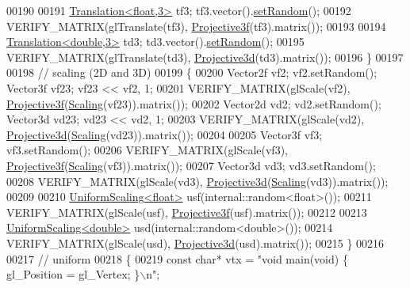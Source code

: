\begin{DoxyCode}
00190     
00191     \hyperlink{group___geometry___module_class_eigen_1_1_translation}{Translation<float,3>} tf3; tf3.vector().\hyperlink{class_eigen_1_1_plain_object_base_af0e576a0e1aefc9ee346de44cc352ba3}{setRandom}();
00192     VERIFY\_MATRIX(glTranslate(tf3), \hyperlink{group___geometry___module_gab14804071b7486b6666f3d324475a478}{Projective3f}(tf3).matrix());
00193     
00194     \hyperlink{group___geometry___module_class_eigen_1_1_translation}{Translation<double,3>} td3;  td3.vector().\hyperlink{class_eigen_1_1_plain_object_base_af0e576a0e1aefc9ee346de44cc352ba3}{setRandom}();
00195     VERIFY\_MATRIX(glTranslate(td3), \hyperlink{group___geometry___module_gab9cec8c457da930391eb73370e07aaae}{Projective3d}(td3).matrix());
00196   \}
00197   
00198   \textcolor{comment}{// scaling (2D and 3D)}
00199   \{
00200     Vector2f vf2; vf2.setRandom(); Vector3f vf23; vf23 << vf2, 1;
00201     VERIFY\_MATRIX(glScale(vf2), \hyperlink{group___geometry___module_gab14804071b7486b6666f3d324475a478}{Projective3f}(\hyperlink{group___geometry___module_ga23a8ed57e3f2973526026765ae697761}{Scaling}(vf23)).matrix());
00202     Vector2d vd2; vd2.setRandom(); Vector3d vd23; vd23 << vd2, 1;
00203     VERIFY\_MATRIX(glScale(vd2), \hyperlink{group___geometry___module_gab9cec8c457da930391eb73370e07aaae}{Projective3d}(\hyperlink{group___geometry___module_ga23a8ed57e3f2973526026765ae697761}{Scaling}(vd23)).matrix());
00204     
00205     Vector3f vf3; vf3.setRandom();
00206     VERIFY\_MATRIX(glScale(vf3), \hyperlink{group___geometry___module_gab14804071b7486b6666f3d324475a478}{Projective3f}(\hyperlink{group___geometry___module_ga23a8ed57e3f2973526026765ae697761}{Scaling}(vf3)).matrix());
00207     Vector3d vd3; vd3.setRandom();
00208     VERIFY\_MATRIX(glScale(vd3), \hyperlink{group___geometry___module_gab9cec8c457da930391eb73370e07aaae}{Projective3d}(\hyperlink{group___geometry___module_ga23a8ed57e3f2973526026765ae697761}{Scaling}(vd3)).matrix());
00209     
00210     \hyperlink{class_eigen_1_1_uniform_scaling}{UniformScaling<float>} usf(internal::random<float>());
00211     VERIFY\_MATRIX(glScale(usf), \hyperlink{group___geometry___module_gab14804071b7486b6666f3d324475a478}{Projective3f}(usf).matrix());
00212     
00213     \hyperlink{class_eigen_1_1_uniform_scaling}{UniformScaling<double>} usd(internal::random<double>());
00214     VERIFY\_MATRIX(glScale(usd), \hyperlink{group___geometry___module_gab9cec8c457da930391eb73370e07aaae}{Projective3d}(usd).matrix());
00215   \}
00216   
00217   \textcolor{comment}{// uniform}
00218   \{
00219     \textcolor{keyword}{const} \textcolor{keywordtype}{char}* vtx = \textcolor{stringliteral}{"void main(void) \{ gl\_Position = gl\_Vertex; \}\(\backslash\)n"};

\end{DoxyCode}
